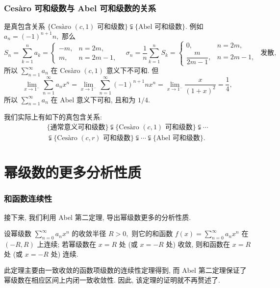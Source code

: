 
\begin{frame}
\frametitle{Cesàro 可和级数与 Abel 可和级数的关系}

是真包含关系 $\{ \text{Cesàro $(c, 1)$ 可和级数} \} \subsetneqq \{ \text{Abel 可和级数} \}$. 例如 $a_n = (-1)^{n+1} n,$ 那么
\[
S_n = \sum_{k=1}^{n} a_k = \begin{cases} -m, & n = 2m, \\ m, & n = 2m - 1, \end{cases} \quad \sigma_n = \dfrac{1}{n} \sum_{k=1}^{n} S_k = \begin{cases} 0, & n = 2m, \\ \dfrac{m}{2m - 1}, & n = 2m - 1, \end{cases} ~~ \text{发散},
\]
所以 $\displaystyle \sum_{n=1}^\infty a_n$ 在 Cesàro $(c, 1)$ 意义下不可和. 但
\[
\lim_{x \to 1^-} \sum_{n=1}^{\infty} a_n x^n = \lim_{x \to 1^-} \sum_{n=1}^{\infty} (-1)^{n+1} n x^n = \lim_{x \to 1^-} \dfrac{x}{(1+x)^2} = \dfrac{1}{4},
\]
所以 $\displaystyle \sum_{n=1}^\infty a_n$ 在 Abel 意义下可和, 且和为 $1/4.$

\pause

\begin{remark}
我们实际上有如下的真包含关系:
\begin{multline*}
\{ \text{通常意义可和级数} \} \subsetneqq \{ \text{Cesàro $(c, 1)$ 可和级数} \} \subsetneqq \cdots \\
\subsetneqq \{ \text{Cesàro $(c, r)$ 可和级数} \} \subsetneqq \cdots \subsetneqq \{ \text{Abel 可和级数} \}.
\end{multline*}
\end{remark}

\end{frame}


\section{幂级数的更多分析性质}


\begin{frame}
\frametitle{和函数连续性}

接下来, 我们利用 Abel 第二定理, 导出幂级数更多的分析性质.

\vspace{1em}

\begin{thm}[幂级数和函数的连续性]
设幂级数 $\displaystyle \sum_{n=0}^{\infty} a_n x^n$ 的收敛半径 $R > 0,$ 则它的和函数 $f(x) = \sum_{n=0}^{\infty} a_n x^n$ 在 $(-R, R)$ 上连续; 若幂级数在 $x = R$ 处 (或 $x = -R$ 处) 收敛, 则和函数在 $x = R$ 处 (或 $x = -R$ 处) 连续.
\end{thm}

\pause
\vspace{1em}

此定理主要由一致收敛的函数项级数的连续性定理得到, 而 Abel 第二定理保证了幂级数在相应区间上内闭一致收敛性. 因此, 该定理的证明就不再赘述了.

\end{frame}

